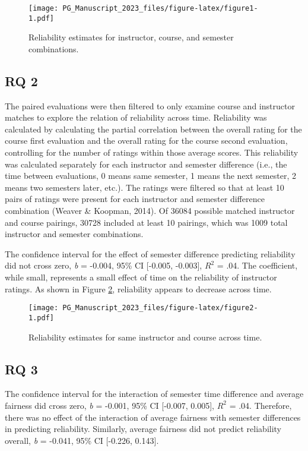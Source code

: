 \documentclass[
  man]{apa7}
\begin{document}
\begin{figure}
\centering
\texttt{[image: PG\_Manuscript\_2023\_files/figure-latex/figure1-1.pdf]}
\caption{\label{fig:figure1}Reliability estimates for instructor, course, and semester combinations.}
\end{figure}

\hypertarget{rq-2-1}{%
\subsection{RQ 2}\label{rq-2-1}}

The paired evaluations were then filtered to only examine course and
instructor matches to explore the relation of reliability across time.
Reliability was calculated by calculating the partial correlation
between the overall rating for the course first evaluation and the
overall rating for the course second evaluation, controlling for the
number of ratings within those average scores. This reliability was
calculated separately for each instructor and semester difference (i.e.,
the time between evaluations, 0 means same semester, 1 means the next
semester, 2 means two semesters later, etc.). The ratings were filtered
so that at least 10 pairs of ratings were present for each instructor
and semester difference combination (Weaver \& Koopman, 2014). Of
36084 possible matched instructor and course pairings,
30728 included at
least 10 pairings, which was 1009 total instructor and
semester combinations.

The confidence interval for the effect of semester difference predicting
reliability did not cross zero, \emph{b} =
-0.004, 95\% CI
{[}-0.005,
-0.003{]}, \(R^2\) =
.04.
The coefficient, while small, represents a small effect of time on the
reliability of instructor ratings. As shown in Figure
\ref{fig:figure2}, reliability appears to decrease across time.

\begin{figure}
\centering
\texttt{[image: PG\_Manuscript\_2023\_files/figure-latex/figure2-1.pdf]}
\caption{\label{fig:figure2}Reliability estimates for same instructor and course across time.}
\end{figure}

\hypertarget{rq-3-1}{%
\subsection{RQ 3}\label{rq-3-1}}

The confidence interval for the interaction of semester time difference
and average fairness did cross zero, \emph{b} =
-0.001, 95\% CI
{[}-0.007,
0.005{]}, \(R^2\) =
.04.
Therefore, there was no effect of the interaction of average fairness
with semester differences in predicting reliability. Similarly, average
fairness did not predict reliability overall, \emph{b} =
-0.041, 95\% CI
{[}-0.226,
0.143{]}.
\end{document}
